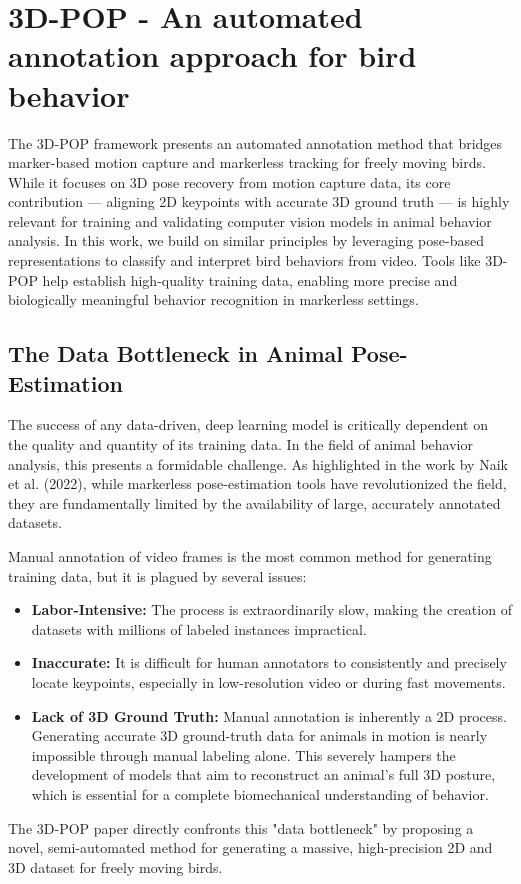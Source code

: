 \section{3D-POP - An automated annotation approach for bird behavior}

The 3D-POP framework presents an automated annotation method that bridges marker-based motion capture and markerless tracking for freely moving birds. While it focuses on 3D pose recovery from motion capture data, its core contribution — aligning 2D keypoints with accurate 3D ground truth — is highly relevant for training and validating computer vision models in animal behavior analysis. In this work, we build on similar principles by leveraging pose-based representations to classify and interpret bird behaviors from video. Tools like 3D-POP help establish high-quality training data, enabling more precise and biologically meaningful behavior recognition in markerless settings.

\subsection{The Data Bottleneck in Animal Pose-Estimation}

The success of any data-driven, deep learning model is critically dependent on the quality and quantity of its training data. In the field of animal behavior analysis, this presents a formidable challenge. As highlighted in the work by Naik et al. (2022), while markerless pose-estimation tools have revolutionized the field, they are fundamentally limited by the availability of large, accurately annotated datasets.

Manual annotation of video frames is the most common method for generating training data, but it is plagued by several issues:
\begin{itemize}
    \item \textbf{Labor-Intensive:} The process is extraordinarily slow, making the creation of datasets with millions of labeled instances impractical.
    \item \textbf{Inaccurate:} It is difficult for human annotators to consistently and precisely locate keypoints, especially in low-resolution video or during fast movements.
    \item \textbf{Lack of 3D Ground Truth:} Manual annotation is inherently a 2D process. Generating accurate 3D ground-truth data for animals in motion is nearly impossible through manual labeling alone. This severely hampers the development of models that aim to reconstruct an animal's full 3D posture, which is essential for a complete biomechanical understanding of behavior.
\end{itemize}
The 3D-POP paper directly confronts this "data bottleneck" by proposing a novel, semi-automated method for generating a massive, high-precision 2D and 3D dataset for freely moving birds.

